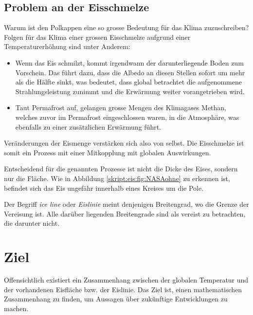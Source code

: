 \begin{refsection}
\subsection{Problem an der Eisschmelze} \label{skript:eis:Problem an der Eisschmelze}
Warum ist den Polkappen eine so grosse Bedeutung für das Klima zuzuschreiben? Folgen für das Klima einer grossen Eisschmelze aufgrund einer Temperaturerhöhung sind unter Anderem: 
\begin{itemize}
	\item Wenn das Eis schmilzt, kommt irgendwann der darunterliegende Boden zum Vorschein. Das führt dazu, dass die Albedo an diesen Stellen sofort um mehr als die Hälfte sinkt, was bedeutet, dass global betrachtet die aufgenommene Strahlungsleistung zunimmt und die Erwärmung weiter vorangetrieben wird.
	\item Taut Permafrost auf, gelangen grosse Mengen des Klimagases Methan, welches zuvor im Permafrost eingeschlossen waren, in die Atmosphäre, was ebenfalls zu einer zusätzlichen Erwärmung führt.
\end{itemize}
Veränderungen der Eismenge verstärken sich also von selbst.
Die Eisschmelze ist somit ein Prozess mit einer Mitkopplung mit globalen Auswirkungen.

Entscheidend für die genannten Prozesse ist nicht die Dicke des Eises, sondern nur die Fläche. Wie in Abbildung \ref{skript:eis:fig:NASAohne} zu erkennen ist, befindet sich das Eis ungefähr innerhalb eines Kreises um die Pole.
\begin{definition}
	Der Begriff {\em ice line} oder {\em Eislinie} meint denjenigen Breitengrad, wo die Grenze der Vereisung ist.
	Alle darüber liegenden Breitengrade sind als vereist zu betrachten, die darunter nicht.
	\label{skript:def:iceline}
\end{definition}
\section{Ziel}
Offensichtlich existiert ein Zusammenhang zwischen der globalen Temperatur und der vorhandenen Eisfläche bzw. der Eislinie. Das Ziel ist, einen mathematischen Zusammenhang zu finden, um Aussagen über zukünftige Entwicklungen zu machen.

\end{refsection}

